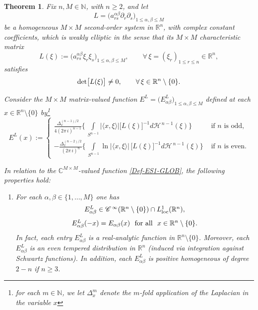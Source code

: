 \documentclass[11pt,reqno]{amsart}
\numberwithin{equation}{section}
\newtheorem{theorem}{Theorem}[section]
\theoremstyle{remark}
\begin{document}
\begin{theorem}\label{FS-prop}
Fix $n,M\in{\mathbb{N}}$, with $n\geq 2$, and let 
%
\begin{equation}\label{L-deEfab.utf}
L=\big(a_{rs}^{\alpha\beta}\partial_r\partial_s\big)_{1\leq\alpha,\beta\leq M}
\end{equation}
%
be a homogeneous $M\times M$ second-order system in ${\mathbb{R}}^n$,
with complex constant coefficients, which is weakly elliptic in the sense that 
its $M\times M$ characteristic matrix
%
\begin{equation}\label{Def-ELLa}
L(\xi):=\big(a^{\alpha\beta}_{rs}\xi_r\xi_s\big)_{1\leq\alpha,\beta\leq M},
\qquad\forall\,\xi=(\xi_r)_{1\leq r\leq n}\in{\mathbb{R}}^n,
\end{equation}
%
satisfies
%
\begin{equation}\label{Def-ELLa-WE}
{\rm det}\big[L(\xi)\big]\not=0,\qquad\forall\,\xi\in{\mathbb{R}}^n\setminus\{0\}.
\end{equation}

Consider the $M\times M$ matrix-valued function $E^L=\big(E^L_{\alpha\beta}\big)_{1\leq\alpha,\beta\leq M}$ defined 
at each $x\in{\mathbb{R}}^{n}\setminus\{0\}$ by\footnote{for each $m\in{\mathbb{N}}$, we let $\Delta_x^m$ denote 
the $m$-fold application of the Laplacian in the variable $x$}
%
\begin{equation}\label{Def-ES1-GLOB}
E^L(x):=\left\{
\begin{array}{ll}
\displaystyle
\frac{\Delta_x^{(n-1)/2}}{4(2\pi\,i)^{n-1}}\Bigg\{\,
\int\limits_{S^{n-1}}\big|\langle x,\xi\rangle\big|
\big[L(\xi)\big]^{-1}d{\mathcal{H}}^{\,n-1}(\xi)\Bigg\}
&\text{ if $n$ is odd},
\\[30pt]
\displaystyle
-\frac{\Delta_x^{(n-2)/2}}{(2\pi\,i)^{n}}\Bigg\{\,\int\limits_{S^{n-1}}
\ln\big|\langle x,\xi\rangle\big|\,\big[L(\xi)\big]^{-1}d{\mathcal{H}}^{\,n-1}(\xi)\Bigg\}
&\text{ if $n$ is even}.
\end{array}
\right.
\end{equation}

In relation to the ${\mathbb{C}}^{M\times M}$-valued function \eqref{Def-ES1-GLOB}, 
the following properties hold:

\begin{enumerate}
\item[(1)] For each $\alpha,\beta\in\{1,\dots,M\}$ one has
%
\begin{equation}\label{smmth-odd}
\begin{array}{c}
E^L_{\alpha\beta}\in{\mathscr{C}}^{\,\infty}(\mathbb{R}^n\setminus\{0\})\cap L^1_{\rm loc}({\mathbb{R}}^n),
\\[8pt]
E^L_{\alpha\beta}(-x)=E_{\alpha\beta}(x)\,\,\text{ for all }\,\,x\in{\mathbb{R}}^n\setminus\{0\}.
\end{array}
\end{equation}
%
In fact, each entry $E^L_{\alpha\beta}$ is a real-analytic function in ${\mathbb{R}}^n\setminus\{0\}$.
Moreover, each $E^L_{\alpha\beta}$ is an even tempered distribution in $\mathbb{R}^n$
{\rm (}induced via integration against Schwartz functions{\rm )}. In addition, 
each $E^L_{\alpha\beta}$ is positive homogeneous of degree $2-n$ if $n\geq 3$.


\end{enumerate}
\end{theorem}
\end{document}
